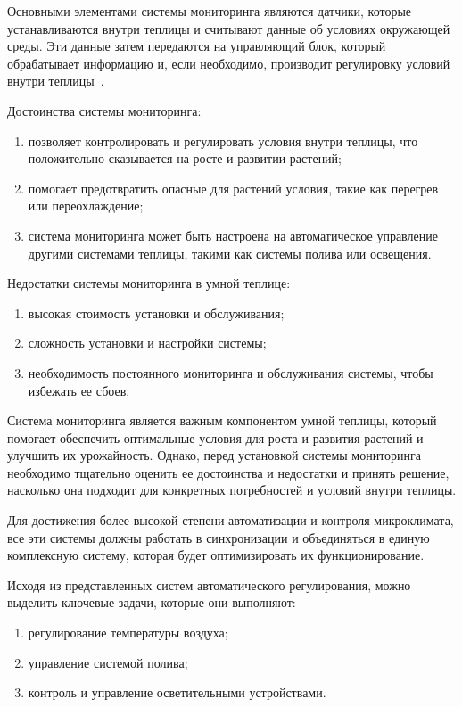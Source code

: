Основными элементами системы мониторинга являются датчики, которые устанавливаются внутри теплицы и считывают данные об условиях окружающей среды. Эти данные затем передаются на управляющий блок, который обрабатывает информацию и, если необходимо, производит регулировку условий внутри теплицы~\cite{Monitoring}.

Достоинства системы мониторинга:

\begin{enumerate}
    \item позволяет контролировать и регулировать условия внутри теплицы, что положительно сказывается на росте и развитии растений;
    \item помогает предотвратить опасные для растений условия, такие как перегрев или переохлаждение;
    \item система мониторинга может быть настроена на автоматическое управление другими системами теплицы, такими как системы полива или освещения.
\end{enumerate}

Недостатки системы мониторинга в умной теплице:

\begin{enumerate}
    \item высокая стоимость установки и обслуживания;
    \item сложность установки и настройки системы;
    \item необходимость постоянного мониторинга и обслуживания системы, чтобы избежать ее сбоев.
\end{enumerate}

Система мониторинга является важным компонентом умной теплицы, который помогает обеспечить оптимальные условия для роста и развития растений и улучшить их урожайность. Однако, перед установкой системы мониторинга необходимо тщательно оценить ее достоинства и недостатки и принять решение, насколько она подходит для конкретных потребностей и условий внутри теплицы.

Для достижения более высокой степени автоматизации и контроля микроклимата, все эти системы должны работать в синхронизации и объединяться в единую комплексную систему, которая будет оптимизировать их функционирование.

Исходя из представленных систем автоматического регулирования, можно выделить ключевые задачи, которые они выполняют:

\begin{enumerate}
    \item регулирование температуры воздуха;
    \item управление системой полива;
    \item контроль и управление осветительными устройствами.
\end{enumerate}

